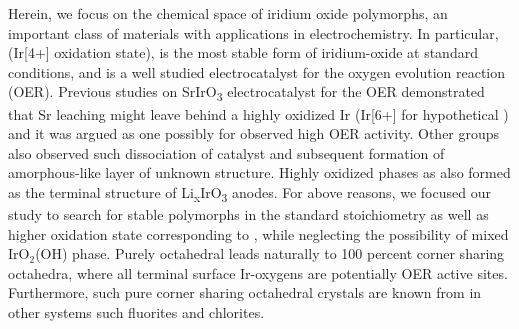 


Herein, we focus on the chemical space of iridium oxide polymorphs,
an important class of materials with applications in electrochemistry.
In particular, \rIrOtwo (Ir[4+] oxidation state), is the most stable form of iridium-oxide at standard conditions,
and is a well studied electrocatalyst for the oxygen evolution reaction (OER).
\cite{Seitz2016,Lee2012a,McCrory2015,Trotochaud2012,Danilovic2014,Carmo2013,Miles1978,Beni1979}
%
Previous studies on SrIrO\textsubscript{3} electrocatalyst for the OER demonstrated that Sr leaching might leave behind a highly oxidized Ir (Ir[6+] for hypothetical \IrOthree) and it was argued as one possibly for observed high OER activity.\cite{Seitz2016}
Other groups also observed such dissociation of \IrOx catalyst and subsequent formation of amorphous-like layer of unknown structure. \cite{Pearce2017}
%
Highly oxidized \IrOthree phases as also formed as the terminal structure of Li\textsubscript{x}IrO\textsubscript{3} anodes.\cite{Pearce2017}
%
For above reasons, we focused our study to search for stable polymorphs in the standard \IrOtwo stoichiometry as well as higher oxidation state corresponding to \IrOthree,
while neglecting the possibility of mixed IrO$_2$(OH) phase.
%
Purely octahedral \IrOthree leads naturally to 100 percent corner sharing octahedra, where all terminal surface Ir-oxygens are potentially OER active sites.
Furthermore, such pure corner sharing octahedral crystals are known from in other systems such fluorites and chlorites.



